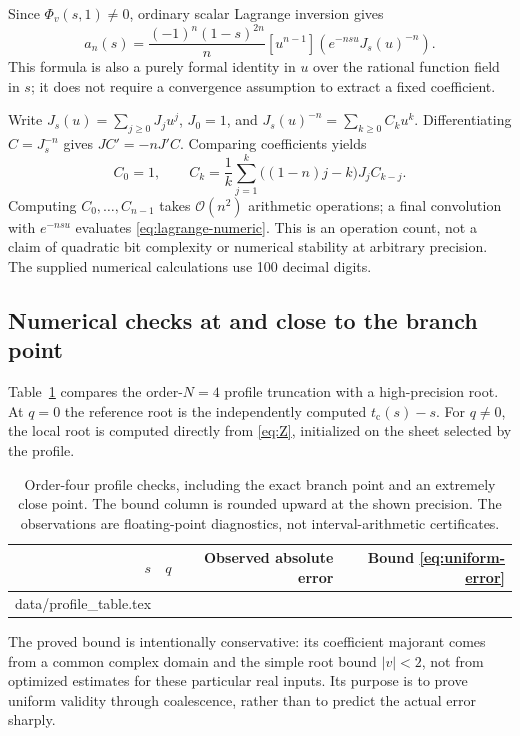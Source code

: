\documentclass[11pt,a4paper]{article}
\makeatletter
\theoremstyle{definition}
\theoremstyle{remark}
\newcommand{\OO}{\mathcal O}
\newcommand{\tc}{t_{\mathrm c}}
\newcommand{\coeff}[2]{[#1^{#2}]}
\newcommand{\tableinput}[1]{\@@input #1 }
\makeatother
\begin{document}
Since $\Phi_v(s,1)\ne0$, ordinary scalar Lagrange inversion gives
\begin{equation}\label{eq:lagrange-numeric}
 a_n(s)=\frac{(-1)^n(1-s)^{2n}}n
         \coeff{u}{n-1}\left(e^{-nsu}J_s(u)^{-n}\right).
\end{equation}
This formula is also a purely formal identity in $u$ over the rational
function field in $s$; it does not require a convergence assumption to
extract a fixed coefficient.

Write $J_s(u)=\sum_{j\ge0}J_j u^j$, $J_0=1$, and
$J_s(u)^{-n}=\sum_{k\ge0}C_k u^k$. Differentiating
$C=J_s^{-n}$ gives $JC'=-nJ'C$. Comparing coefficients yields
\begin{equation}\label{eq:unit-recurrence}
 C_0=1,\qquad
 C_k=\frac1k\sum_{j=1}^k\bigl((1-n)j-k\bigr)J_jC_{k-j}.
\end{equation}
Computing $C_0,\ldots,C_{n-1}$ takes $\OO(n^2)$ arithmetic operations;
a final convolution with $e^{-nsu}$ evaluates
\eqref{eq:lagrange-numeric}. This is an operation count, not a claim of
quadratic bit complexity or numerical stability at arbitrary precision.
The supplied numerical calculations use 100 decimal digits.

\subsection{Numerical checks at and close to the branch point}
Table~\ref{tab:profiles} compares the order-$N=4$ profile truncation with
a high-precision root. At $q=0$ the reference root is the independently
computed $\tc(s)-s$. For $q\ne0$, the local root is computed directly
from \eqref{eq:Z}, initialized on the sheet selected by the profile.

\begin{table}[htbp]
\centering
{}
\begin{tabular}{@{}rrrr@{}}
\toprule
$s$ & $q$ & {Observed absolute error} & {Bound \eqref{eq:uniform-error}}\\
\midrule
\tableinput{data/profile_table.tex}
\bottomrule
\end{tabular}
\caption{Order-four profile checks, including the exact branch point and
an extremely close point. The bound column is rounded upward at the
shown precision. The observations are floating-point diagnostics, not
interval-arithmetic certificates.}
\label{tab:profiles}
\end{table}

The proved bound is intentionally conservative: its coefficient majorant
comes from a common complex domain and the simple root bound $|v|<2$,
not from optimized estimates for these particular real inputs. Its
purpose is to prove uniform validity through coalescence, rather than to
predict the actual error sharply.
\end{document}
